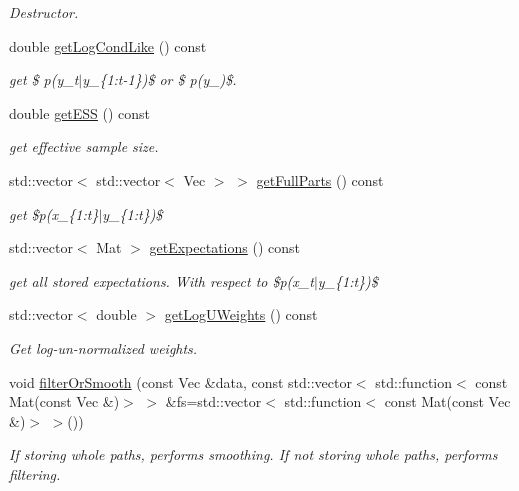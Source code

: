 \begin{DoxyCompactItemize}
\begin{DoxyCompactList}\small\item\em Destructor. \end{DoxyCompactList}\item 
double \hyperlink{classSISRFilter_a9bec319e692266cacdd7e6cd9b60e77d}{get\+Log\+Cond\+Like} () const 
\begin{DoxyCompactList}\small\item\em get \$ p(y\+\_\+t$\vert$y\+\_\+\{1\+:t-\/1\})\$ or \$ p(y\+\_)\$. \end{DoxyCompactList}\item 
double \hyperlink{classSISRFilter_aab226ed51d07c493151a6788e6f90b86}{get\+E\+SS} () const 
\begin{DoxyCompactList}\small\item\em get effective sample size. \end{DoxyCompactList}\item 
std\+::vector$<$ std\+::vector$<$ Vec $>$ $>$ \hyperlink{classSISRFilter_a8ca159b052883c9c4dc0231145f6fe85}{get\+Full\+Parts} () const 
\begin{DoxyCompactList}\small\item\em get \$p(x\+\_\+\{1\+:t\}$\vert$y\+\_\+\{1\+:t\})\$ \end{DoxyCompactList}\item 
std\+::vector$<$ Mat $>$ \hyperlink{classSISRFilter_a4dd3b90b857114e599a8f71703cb768e}{get\+Expectations} () const 
\begin{DoxyCompactList}\small\item\em get all stored expectations. With respect to \$p(x\+\_\+t$\vert$y\+\_\+\{1\+:t\})\$ \end{DoxyCompactList}\item 
std\+::vector$<$ double $>$ \hyperlink{classSISRFilter_aa87ac349cbc21f70fb51c24fcbbc521a}{get\+Log\+U\+Weights} () const 
\begin{DoxyCompactList}\small\item\em Get log-\/un-\/normalized weights. \end{DoxyCompactList}\item 
void \hyperlink{classSISRFilter_a8c22a038dc47490b5532f2ec6c21a548}{filter\+Or\+Smooth} (const Vec \&data, const std\+::vector$<$ std\+::function$<$ const Mat(const Vec \&)$>$ $>$ \&fs=std\+::vector$<$ std\+::function$<$ const Mat(const Vec \&)$>$ $>$())
\begin{DoxyCompactList}\small\item\em If storing whole paths, performs smoothing. If not storing whole paths, performs filtering. \end{DoxyCompactList}\item 

\end{DoxyCompactItemize}
